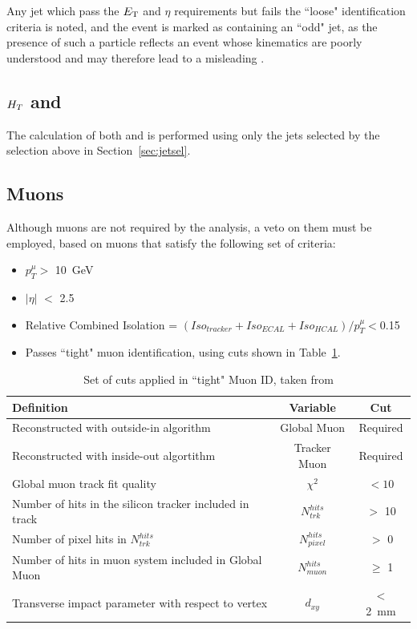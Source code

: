 Any jet which pass the ${E_{\text T}}$ and $\eta$ requirements but fails the ``loose" identification criteria is noted, and the event is marked as containing an ``odd" jet, as the presence of such a particle reflects an event whose kinematics are poorly understood and may therefore lead to a misleading \MHT.
\subsection{$H_{T} $ and \MHT}
The calculation of both \HT and \MHT is performed using only the jets selected by the selection above in Section~\ref{sec:jetsel}.

\subsection{Muons} 
Although muons are not required by the analysis, a veto on them must be employed, based on muons that satisfy the following set of criteria:
\begin{itemize}
\item $p^{\mu}_{T} >$ 10~GeV
\item $| \eta|$ $<$ 2.5
\item Relative Combined Isolation = $(Iso_{tracker} + Iso_{ECAL} + Iso_{HCAL}) / p^{\mu}_{T} < $0.15\footnotemark
\item Passes ``tight" muon identification, using cuts shown in Table~\ref{tab:muid}.
\end{itemize}

\begin{table}[htbp]
\centering
\begin{tabular}{ m{8.9cm}  c  c }
\hline
\hline
 \centering Definition & Variable & Cut \\
\hline
\hline
 Reconstructed with outside-in algorithm & Global Muon & Required\\
Reconstructed with inside-out algortithm & Tracker Muon & Required\\
 Global muon track fit quality & $\chi^{2}$ & $< 10$ \\ 
Number of hits in the silicon tracker included in track & $N^{hits}_{\textit{trk}}$ &$ >$ 10\\
Number of pixel hits in $N^{hits}_{trk}$ & $N^{hits}_{\textit{pixel}}$ & $ > $ 0\\
Number of hits in muon system included in Global Muon & $N^{hits}_{\textit{muon}}$ & $\geq $ 1\\
Transverse impact parameter with respect to vertex & $d_{xy}$ & $< $ 2~mm\\
\hline
\end{tabular}
\caption{\label{tab:muid} Set of cuts applied in ``tight" Muon ID, taken from \cite{MUO-10-002}}
\end{table}



